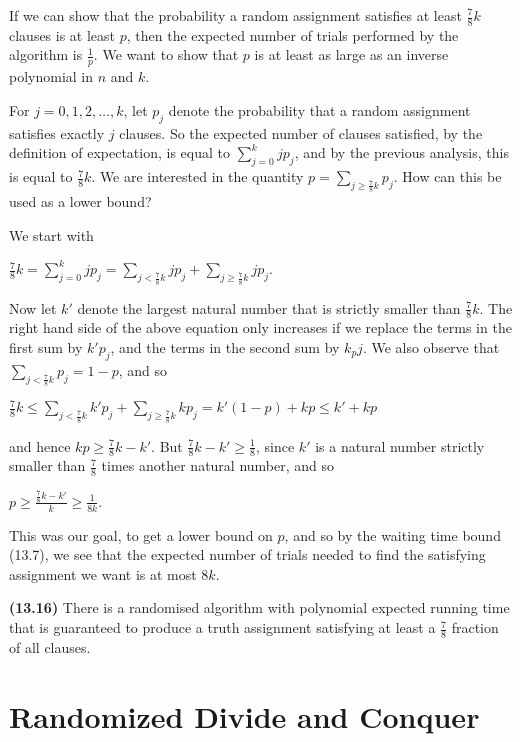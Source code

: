 \documentclass{proc}
\begin{document}
If we can show that the probability a random assignment satisfies at least $\frac{7}{8}k$ clauses is at least $p$, then the expected number of trials performed by the algorithm is $\frac{1}{p}$. We want to show that $p$ is at least as large as an inverse polynomial in $n$ and $k$.

For $j = 0, 1, 2, \ldots, k$, let $p_j$ denote the probability that a random assignment satisfies exactly $j$ clauses.  So the expected number of clauses satisfied, by the definition of expectation, is equal to $\sum_{j=0}^{k} jp_j$, and by the previous analysis, this is equal to $\frac{7}{8}k$. We are interested in the quantity $p = \sum_{j \ge \frac{7}{8}k} p_j$. How can this be used as a lower bound?

We start with 

$\frac{7}{8}k = \sum_{j=0}^{k} jp_j = \sum_{j < \frac{7}{8}k} jp_j + \sum_{j \ge \frac{7}{8}k} jp_j$.

Now let $k'$ denote the largest natural number that is strictly smaller than $\frac{7}{8}k$. The right hand side of the above equation only increases if we replace the terms in the first sum by $k'p_j$, and the terms in the second sum by $k_pj$. We also observe that $\sum_{j<\frac{7}{8}k} p_j = 1 - p$, and so

$ \frac{7}{8}k \le \sum_{j<\frac{7}{8}k} k'p_j + \sum_{j \ge \frac{7}{8}k} kp_j = k'(1-p) + kp \le k' + kp $

and hence $kp \ge \frac{7}{8}k - k'$. But $\frac{7}{8}k - k' \ge \frac{1}{8}$, since $k'$ is a natural number strictly smaller than $\frac{7}{8}$ times another natural number, and so 

\begin{mdframed}
    $p \ge \frac{\frac{7}{8}k - k'}{k} \ge \frac{1}{8k}$.
\end{mdframed}
This was our goal, to get a lower bound on $p$, and so by the waiting time bound (13.7), we see that the expected number of trials needed to find the satisfying assignment we want is at most $8k$.

\begin{mdframed}
    \textbf{(13.16)} There is a randomised algorithm with polynomial expected running time that is guaranteed to produce a truth assignment satisfying at least a $\frac{7}{8}$ fraction of all clauses.
\end{mdframed}

\section{Randomized Divide and Conquer}
\end{document}

